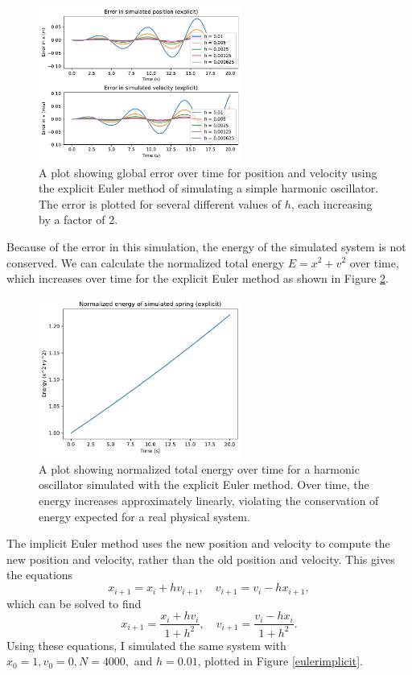 \documentclass{article}
\begin{document}
\begin{figure}[H]
	\centering
	\includegraphics[width=0.6\textwidth]{eulerexpliciterror.pdf}
	\caption{A plot showing global error over time for position and velocity using the explicit Euler method of simulating a simple harmonic oscillator. The error is plotted for several different values of $h$, each increasing by a factor of 2.}
	\label{expliciterror}
\end{figure}

Because of the error in this simulation, the energy of the simulated system is not conserved. We can calculate the normalized total energy $E=x^2+v^2$ over time, which increases over time for the explicit Euler method as shown in Figure \ref{explicitenergy}. 

\begin{figure}[H]
	\centering
	\includegraphics[width=0.6\textwidth]{eulerexplicitenergy.pdf}
	\caption{A plot showing normalized total energy over time for a harmonic oscillator simulated with the explicit Euler method. Over time, the energy increases approximately linearly, violating the conservation of energy expected for a real physical system.}
	\label{explicitenergy}
\end{figure}

The implicit Euler method uses the new position and velocity to compute the new position and velocity, rather than the old position and velocity. This gives the equations $$x_{i+1}=x_i+hv_{i+1},\quad v_{i+1}=v_i-hx_{i+1},$$ which can be solved to find $$x_{i+1}=\frac{x_i+hv_i}{1+h^2},\quad v_{i+1}=\frac{v_i-hx_i}{1+h^2}.$$ Using these equations, I simulated the same system with $x_0=1,v_0=0,N=4000,$ and $h=0.01$, plotted in Figure \ref{eulerimplicit}.
\end{document}
